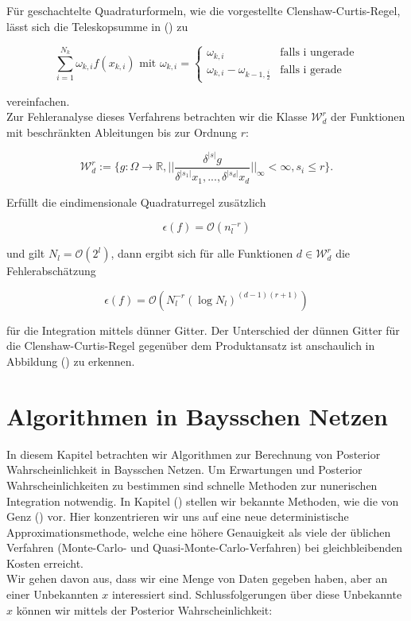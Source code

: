 \documentclass[12pt,a4paper]{scrartcl}
\numberwithin{equation}{section}
\newcommand{\R}{\mathbb{R}} %
\begin{document}
{  Für geschachtelte Quadraturformeln, wie die vorgestellte Clenshaw-Curtis-Regel, lässt sich die Teleskopsumme in ()
  zu 
  
  \begin{equation}
   \sum_{i=1}^{N_k} {\omega}_{k,i}f(x_{k,i}) \text{ mit } {\omega}_{k,i} 
   =  \begin{cases} \omega_{k,i}&\text{falls i ungerade}\\ \omega_{k,i} - \omega_{k-1,\frac{i}{2}}&\text{falls i gerade }\end{cases}
  \end{equation}
  
  vereinfachen. \\
  
  Zur Fehleranalyse dieses Verfahrens betrachten wir die Klasse $\mathcal{W}_d^r$ der Funktionen mit beschränkten
  Ableitungen bis zur Ordnung $r$:
  
  \begin{equation}
   \mathcal{W}_d^r := \{g: \Omega \rightarrow \R, ||\frac{\delta^{|s|}g}{\delta^{|s_1|} x_1,...,\delta^{|s_d|} x_d}||_{\infty} < \infty, s_i \leq r\}.
  \end{equation}
  
  Erfüllt die eindimensionale Quadraturregel zusätzlich 
  
  \begin{equation}
   \epsilon(f) = \mathcal{O}(n_l^{-r})
  \end{equation}

  und gilt $N_l = \mathcal{O}(2^l)$, dann ergibt sich für alle Funktionen $d \in \mathcal{W}_d^r$
  die Fehlerabschätzung
  
  \begin{equation}
   \epsilon(f) = \mathcal{O}(N_l^{-r}(\log N_l)^{(d-1)(r+1)})
  \end{equation}

  für die Integration mittels dünner Gitter. Der Unterschied der dünnen Gitter für die Clenshaw-Curtis-Regel
  gegenüber dem Produktansatz ist anschaulich in Abbildung () zu erkennen.
  
  \section{Algorithmen in Baysschen Netzen}
  
  In diesem Kapitel betrachten wir Algorithmen zur Berechnung von Posterior Wahrscheinlichkeit in Baysschen Netzen.
  Um Erwartungen und Posterior Wahrscheinlichkeiten zu bestimmen sind schnelle Methoden zur nunerischen Integration notwendig. 
  In Kapitel () stellen wir bekannte Methoden, wie die von Genz () vor. Hier konzentrieren wir uns auf eine neue deterministische
  Approximationsmethode, welche eine höhere Genauigkeit als viele der üblichen Verfahren (Monte-Carlo- und Quasi-Monte-Carlo-Verfahren) bei gleichbleibenden Kosten 
  erreicht. \\
  Wir gehen davon aus, dass wir eine Menge von Daten gegeben haben, aber an einer Unbekannten $x$ interessiert sind.
  Schlussfolgerungen über diese Unbekannte $x$ können wir mittels der Posterior Wahrscheinlichkeit: 
  
}
\end{document}
